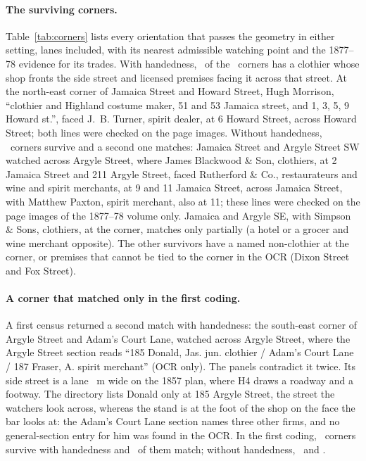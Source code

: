 \documentclass[10pt,a4paper]{article}
\begin{document}
\paragraph{The surviving corners.} Table~\ref{tab:corners} lists every orientation that passes the geometry in either setting, lanes included, with its nearest admissible watching point and the 1877--78 evidence for its trades. With handedness, \nWin\ of the \nSurv\ corners has a clothier whose shop fronts the side street and licensed premises facing it across that street. At the north-east corner of Jamaica Street and Howard Street, Hugh Morrison, ``clothier and Highland costume maker, 51 and 53 Jamaica street, and 1, 3, 5, 9 Howard st.'', faced J.~B. Turner, spirit dealer, at 6 Howard Street, across Howard Street; both lines were checked on the page images. Without handedness, \nSurvNoHand\ corners survive and a second one matches: Jamaica Street and Argyle Street SW watched across Argyle Street, where James Blackwood \& Son, clothiers, at 2 Jamaica Street and 211 Argyle Street, faced Rutherford \& Co., restaurateurs and wine and spirit merchants, at 9 and 11 Jamaica Street, across Jamaica Street, with Matthew Paxton, spirit merchant, also at 11; these lines were checked on the page images of the 1877--78 volume only. Jamaica and Argyle SE, with Simpson \& Sons, clothiers, at the corner, matches only partially (a hotel or a grocer and wine merchant opposite). The other survivors have a named non-clothier at the corner, or premises that cannot be tied to the corner in the OCR (Dixon Street and Fox Street).

\paragraph{A corner that matched only in the first coding.} A first census returned a second match with handedness: the south-east corner of Argyle Street and Adam's Court Lane, watched across Argyle Street, where the Argyle Street section reads ``185 Donald, Jas. jun. clothier / Adam's Court Lane / 187 Fraser, A. spirit merchant'' (OCR only). The panels contradict it twice. Its side street is a lane \WidthACL~m wide on the 1857 plan, where H4 draws a roadway and a footway. The directory lists Donald only at 185 Argyle Street, the street the watchers look across, whereas the stand is at the foot of the shop on the face the bar looks at: the Adam's Court Lane section names three other firms, and no general-section entry for him was found in the OCR. In the first coding, \nSurvFirst\ corners survive with handedness and \nWinFirst\ of them match; without handedness, \nSurvNoHandFirst\ and \nWinNoHandFirst.
\end{document}
